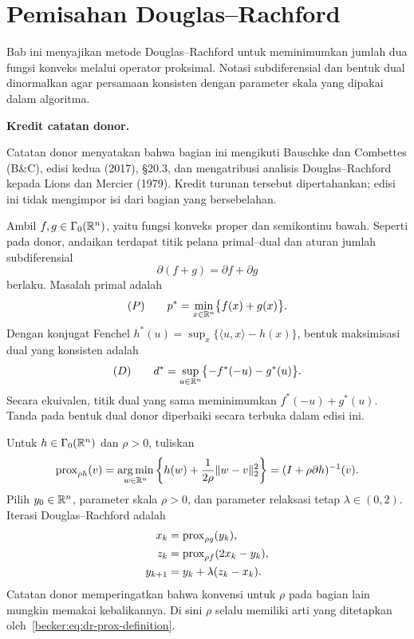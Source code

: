 \chapter{Pemisahan Douglas--Rachford}
\label{becker:chapter:douglas-rachford}

Bab ini menyajikan metode Douglas--Rachford untuk meminimumkan jumlah dua
fungsi konveks melalui operator proksimal. Notasi subdiferensial dan bentuk
dual dinormalkan agar persamaan konsisten dengan parameter skala yang dipakai
dalam algoritma.

\noindent\textbf{Kredit catatan donor.}\par
Catatan donor menyatakan bahwa bagian ini mengikuti Bauschke dan Combettes
(B\&C), edisi kedua (2017), \S20.3, dan mengatribusi analisis
Douglas--Rachford kepada Lions dan Mercier (1979). Kredit turunan tersebut
dipertahankan; edisi ini tidak mengimpor isi dari bagian yang bersebelahan.

Ambil $f,g\in\Gamma_0(\mathbb{R}^n)$, yaitu fungsi konveks proper dan semikontinu
bawah. Seperti pada donor, andaikan terdapat titik pelana primal--dual dan
aturan jumlah subdiferensial
\begin{equation}
  \label{becker:eq:dr-sum-rule}
  \partial(f+g)=\partial f+\partial g
\end{equation}
berlaku. Masalah primal adalah
\begin{equation}
  \label{becker:eq:dr-primal}
  (P)\qquad p^*=\min_{x\in\mathbb{R}^n}\bigl\{f(x)+g(x)\bigr\}.
\end{equation}
Dengan konjugat Fenchel
$h^*(u)=\sup_x\{\langle u,x\rangle-h(x)\}$, bentuk maksimisasi dual yang
konsisten adalah
\begin{equation}
  \label{becker:eq:dr-dual}
  (D)\qquad
  d^*=\sup_{u\in\mathbb{R}^n}\bigl\{-f^*(-u)-g^*(u)\bigr\}.
\end{equation}
Secara ekuivalen, titik dual yang sama meminimumkan
$f^*(-u)+g^*(u)$. Tanda pada bentuk dual donor diperbaiki secara terbuka
dalam edisi ini.

Untuk $h\in\Gamma_0(\mathbb{R}^n)$ dan $\rho>0$, tuliskan
\begin{equation}
  \label{becker:eq:dr-prox-definition}
  \mathrm{prox}_{\rho h}(v)
  =\operatorname*{arg\,min}_{w\in\mathbb{R}^n}
    \left\{h(w)+\frac{1}{2\rho}\|w-v\|_2^2\right\}
  =(I+\rho\partial h)^{-1}(v).
\end{equation}
Pilih $y_0\in\mathbb{R}^n$, parameter skala $\rho>0$, dan parameter relaksasi tetap
$\lambda\in(0,2)$. Iterasi Douglas--Rachford adalah
\begin{equation}
  \label{becker:eq:dr-iteration}
  \begin{aligned}
    x_k&=\mathrm{prox}_{\rho g}(y_k),\\
    z_k&=\mathrm{prox}_{\rho f}(2x_k-y_k),\\
    y_{k+1}&=y_k+\lambda(z_k-x_k).
  \end{aligned}
\end{equation}
Catatan donor memperingatkan bahwa konvensi untuk $\rho$ pada bagian lain
mungkin memakai kebalikannya. Di sini $\rho$ selalu memiliki arti yang
ditetapkan oleh~\eqref{becker:eq:dr-prox-definition}.

